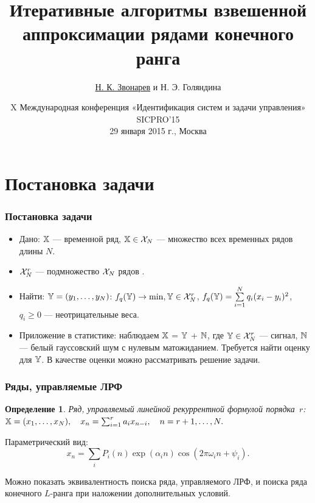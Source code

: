 \documentclass[unicode, notheorems]{beamer}
\title{Итеративные алгоритмы взвешенной аппроксимации рядами конечного ранга}
\author{\underline{Н. К. Звонарев} и Н. Э. Голяндина}
\institute[СПбГУ]{Санкт-Петербургский государственный университет \\
}
\date{
	X Международная конференция «Идентификация систем и задачи управления» SICPRO’15 \\
    29 января 2015 г., Москва
}
\newtheorem{definition}{Определение}
\begin{document}
\begin{frame}
    \titlepage
\end{frame}

\section{Постановка задачи}

\begin{frame}
    \frametitle{Постановка задачи}
    \begin{itemize}
    \item Дано: $\mathbb{X}$ --- временной ряд, $\mathbb{X} \in \mathcal{X}_N$ --- множество всех временных рядов длины $N$.
    \item $\mathcal{X}_N^r$ --- подмножество $\mathcal{X}_N$ рядов .
    \item Найти: $\mathbb{Y} = (y_1, \ldots, y_N)$: $f_q(\mathbb{Y}) \to \min, \mathbb{Y} \in \mathcal{X}_N^r$, $f_q(\mathbb{Y}) = \sum \limits_{i=1}^N q_i(x_i - y_i)^2$, $q_i \ge 0$ --- неотрицательные веса.
    \item Приложение в статистике: наблюдаем $\mathbb{X}$ = $\mathbb{Y}$ + $\mathbb{N}$, где $\mathbb{Y} \in \mathcal{X}_N^r$ --- сигнал, $\mathbb{N}$ --- белый гауссовский шум с нулевым матожиданием. Требуется найти оценку для $\mathbb{Y}$. В качестве оценки можно рассматривать решение задачи.
    \end{itemize}

\end{frame}

\begin{frame}
	\frametitle{Ряды, управляемые ЛРФ}
	\begin{definition}
		Ряд, управляемый линейной рекуррентной формулой порядка~$r$: $\mathbb{X} = (x_1, \ldots, x_N), \quad x_n = \sum_{i = 1}^{r} a_i x_{n-i}, \quad n = r + 1, \ldots, N.$
	\end{definition}
	Параметрический вид:
	\begin{equation*}
	x_n = \sum_i P_i(n) \exp(\alpha_i n) \cos(2 \pi \omega_i n + \psi_i).
	\end{equation*}
	
	Можно показать эквивалентность поиска ряда, управляемого ЛРФ, и поиска ряда конечного $L$-ранга при наложении дополнительных условий.
\end{frame}
\end{document}
